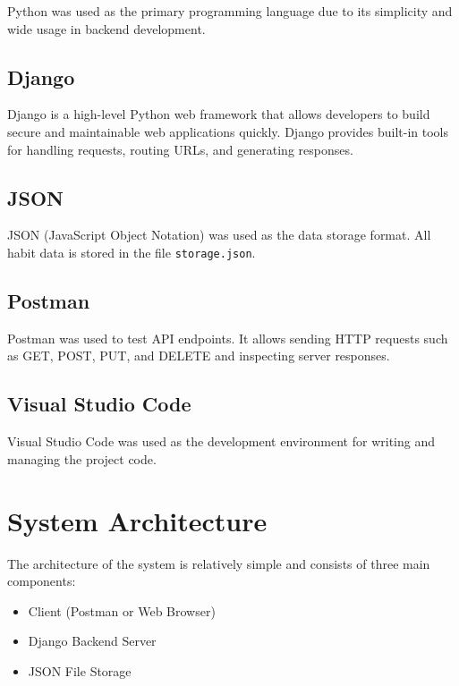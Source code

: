 \documentclass[12pt]{article}
\begin{document}
Python was used as the primary programming language due to its simplicity and wide usage 
in backend development.

\subsection{Django}

Django is a high-level Python web framework that allows developers to build secure 
and maintainable web applications quickly. Django provides built-in tools for handling 
requests, routing URLs, and generating responses.

\subsection{JSON}

JSON (JavaScript Object Notation) was used as the data storage format. 
All habit data is stored in the file \texttt{storage.json}.

\subsection{Postman}

Postman was used to test API endpoints. It allows sending HTTP requests such as GET, 
POST, PUT, and DELETE and inspecting server responses.

\subsection{Visual Studio Code}

Visual Studio Code was used as the development environment for writing and managing 
the project code.

\section{System Architecture}

The architecture of the system is relatively simple and consists of three main components:

\begin{itemize}

\item Client (Postman or Web Browser)
\item Django Backend Server
\item JSON File Storage

\end{itemize}
\end{document}
